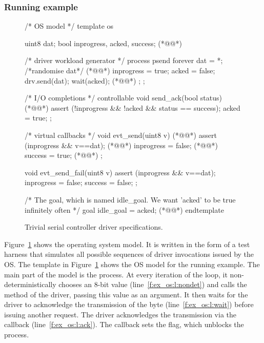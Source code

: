 \subsubsection{Running example}

\begin{figure}
\lstset{firstnumber=last}
\begin{tsllisting}[name=ex]
/* OS model */
template os 

    uint8 dat;
    bool inprogress, acked, success; (*@\label{f:ex_os:l:vars}@*)

    /* driver workload generator */
    process psend {
        forever {
            dat = *; /*randomise dat*/ (*@\label{f:ex_os:l:nondet}@*)
            inprogress = true;
            acked = false;
            drv.send(dat);
            wait(acked); (*@\label{f:ex_os:l:wait}@*)
        };
    };

    /* I/O completions */
    controllable void send_ack(bool status) { (*@\label{f:ex_os:l:ack}@*)
        assert (!inprogress && !acked && status == success);
        acked = true;
    };

    /* virtual callbacks */
    void evt_send(uint8 v) { (*@\label{f:ex_os:l:send_cb}@*)
        assert (inprogress && v==dat); (*@\label{f:ex_os:l:assert}@*)
        inprogress = false; (*@\label{f:ex_os:l:inprogress}@*)
        success = true; (*@\label{f:ex_os:l:success}@*)
    };

    void evt_send_fail(uint8 v) {
        assert (inprogress && v==dat);
        inprogress = false;
        success = false;
    };

    /* The goal, which is named idle_goal. We want 'acked' to be 
    true infinitely often */
    goal idle_goal = acked; (*@\label{f:ex_os:l:goal}@*)
endtemplate
\end{tsllisting}
\caption{Trivial serial controller driver specifications.}
\label{f:ex_os}
\end{figure}

Figure~\ref{f:ex_os} shows the operating system model. It is written in the form of a test harness that simulates all possible sequences of driver invocations issued by the OS\@.  The  template in Figure~\ref{f:ex_os} shows the OS model for the running example.  The main part of the model is the  process.  At every iteration of the loop, it non-deterministically chooses an 8-bit value (line~\ref{f:ex_os:l:nondet}) and calls the  method of the driver, passing this value as an argument.  It then waits for the driver to acknowledge the transmission of the byte (line~\ref{f:ex_os:l:wait}) before issuing another request.  The driver acknowledges the transmission via the  callback (line~\ref{f:ex_os:l:ack}).  The callback sets the  flag, which unblocks the  process.


